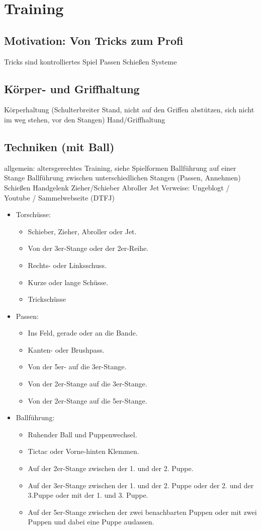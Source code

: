 \chapter{Training}
\label{training}

\section{Motivation: Von Tricks zum Profi}
Tricks sind kontrolliertes Spiel
Passen
Schießen
Systeme

\section{Körper- und Griffhaltung}
Körperhaltung (Schulterbreiter Stand, nicht auf den Griffen abstützen, sich nicht im weg stehen, vor den Stangen)
Hand/Griffhaltung

\section{Techniken (mit Ball)}
allgemein: altersgerechtes Training, siehe Spielformen
Ballführung auf einer Stange
Ballführung zwischen unterschiedlichen Stangen (Passen, Annehmen)
Schießen
Handgelenk
Zieher/Schieber
Abroller
Jet
Verweise: Ungeblogt / Youtube / Sammelwebseite (DTFJ)

\begin{itemize}
\item Torschüsse: 
\begin{itemize}
\item Schieber, Zieher, Abroller oder Jet.
\item Von der 3er-Stange oder der 2er-Reihe.
\item Rechts- oder Linksschuss.
\item Kurze oder lange Schüsse.
\item Trickschüsse
\end{itemize}
\item Passen:
\begin{itemize}
\item Ins Feld, gerade oder an die Bande.
\item Kanten- oder Brushpass.
\item Von der 5er- auf die 3er-Stange.
\item Von der 2er-Stange auf die 3er-Stange.
\item Von der 2er-Stange auf die 5er-Stange.
\end{itemize}
\item Ballführung: 
\begin{itemize}
\item Ruhender Ball und Puppenwechsel.
\item Tictac oder Vorne-hinten Klemmen.
\item Auf der 2er-Stange zwischen der 1. und der 2. Puppe.
\item Auf der 3er-Stange zwischen der 1. und der 2. Puppe oder der 2. und der 3.Puppe oder mit der 1. und 3. Puppe.
\item Auf der 5er-Stange zwischen der zwei benachbarten Puppen oder mit zwei Puppen und dabei eine Puppe auslassen.
\end{itemize}
\end{itemize}

